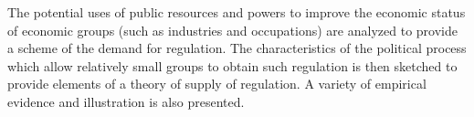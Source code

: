The potential uses of public resources and powers to improve the economic status of economic groups (such as industries and occupations) are analyzed to provide a scheme of the demand for regulation. The characteristics of the political process which allow relatively small groups to obtain such regulation is then sketched to provide elements of a theory of supply of regulation. A variety of empirical evidence and illustration is also presented.
